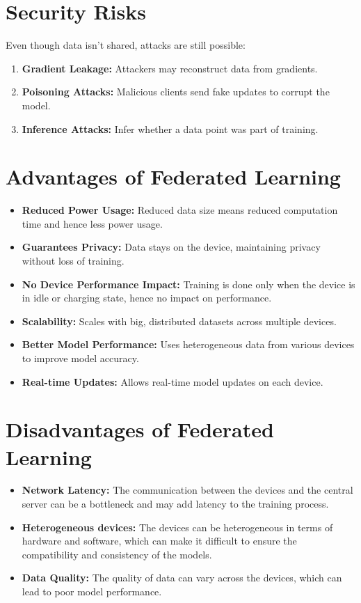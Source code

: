 \documentclass[12pt]{article}
\begin{document}
\section{Security Risks}
\label{sec:security}

Even though data isn't shared, attacks are still possible:
\begin{enumerate}
    \item \textbf{Gradient Leakage:} Attackers may reconstruct data from gradients.
    \item \textbf{Poisoning Attacks:} Malicious clients send fake updates to corrupt the model.
    \item \textbf{Inference Attacks:} Infer whether a data point was part of training.
\end{enumerate}

\section{Advantages of Federated Learning}
\label{sec:advantages}

\begin{itemize}
    \item \textbf{Reduced Power Usage:} Reduced data size means reduced computation time and hence less power usage.
    \item \textbf{Guarantees Privacy:} Data stays on the device, maintaining privacy without loss of training.
    \item \textbf{No Device Performance Impact:} Training is done only when the device is in idle or charging state, hence no impact on performance.
    \item \textbf{Scalability:} Scales with big, distributed datasets across multiple devices.
    \item \textbf{Better Model Performance:} Uses heterogeneous data from various devices to improve model accuracy.
    \item \textbf{Real-time Updates:} Allows real-time model updates on each device.
\end{itemize}

\section{Disadvantages of Federated Learning}
\label{sec:disadvantages}

\begin{itemize}
    \item \textbf{Network Latency:} The communication between the devices and the central server can be a bottleneck and may add latency to the training process.
    \item \textbf{Heterogeneous devices:} The devices can be heterogeneous in terms of hardware and software, which can make it difficult to ensure the compatibility and consistency of the models.
    \item \textbf{Data Quality:} The quality of data can vary across the devices, which can lead to poor model performance.
\end{itemize}
\end{document}
